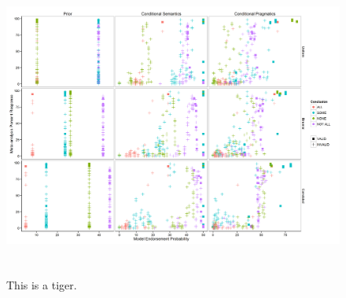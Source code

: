 \documentclass[10pt,letterpaper]{article}
\begin{document}
\begin{figure}[t!] %
\centering
  \includegraphics[width=\textwidth,height=10cm]{multiScatter_n6_0,25_alpha1}
  \caption{This is a tiger.}
\end{figure}


%
%
%
\end{document}

